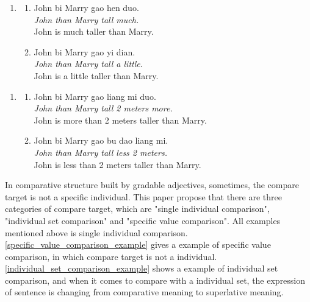 \documentclass{ctexart}
\begin{document}
\begin{enumerate}[resume]
    \item
    \begin{enumerate}[ref=(\arabic{enumi}\alph*)]
        \item \label{dp_big_vague_example}
        John bi Marry gao hen duo.\\
        \textit{John than Marry tall much.} \\
        John is much taller than Marry.

        \item \label{dp_small_vague_example}
        John bi Marry gao yi dian.\\
        \textit{John than Marry tall a little.}\\
        John is a little taller than Marry.

    \end{enumerate}
\end{enumerate}

\begin{enumerate}[resume]
    \item
    \begin{enumerate}[ref=(\arabic{enumi}\alph*)]
        \item \label{dp_value_big_vague_example}
        John bi Marry gao liang mi duo.\\
        \textit{John than Marry tall 2 meters more.} \\
        John is more than 2 meters taller than Marry.

        \item \label{dp_value_small_vague_example}
        John bi Marry gao bu dao liang mi.\\
        \textit{John than Marry tall less 2 meters.} \\
        John is less than 2 meters taller than Marry.
    \end{enumerate}
\end{enumerate}

In comparative structure built by gradable adjectives, sometimes, the compare target is not a specific individual. This paper propose that there are three categories of compare target, which are "single individual comparison", "individual set comparison" and "specific value comparison". All examples mentioned above is single individual comparison. \ref{specific_value_comparison_example} gives a example of specific value comparison, in which compare target is not a individual. \ref{individual_set_comparison_example} shows a example of individual set comparison, and when it comes to compare with a individual set, the expression of sentence is changing from comparative meaning to superlative meaning.
\end{document}
